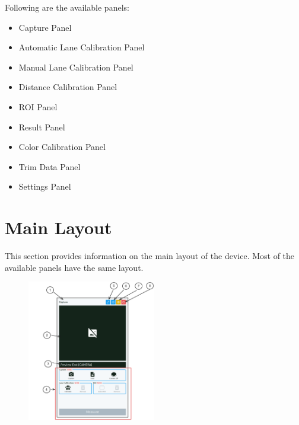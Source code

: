 Following are the available panels:

\begin{itemize}
    \item Capture Panel
    \item Automatic Lane Calibration Panel
    \item Manual Lane Calibration Panel
    \item Distance Calibration Panel
    \item ROI Panel
    \item Result Panel
    \item Color Calibration Panel
    \item Trim Data Panel
    \item Settings Panel
\end{itemize}

\pagebreak

\renewcommand\thempfootnote{\arabic{mpfootnote}}


\section{Main Layout}
\label{sec:main-layout}

This section provides information on the main layout of the device. Most of the available panels have the same layout.

\begin{figure}[H]
    \centering
    \includegraphics[width=0.5\textwidth]{texs/chapter1/image/p9.png}
\end{figure}

